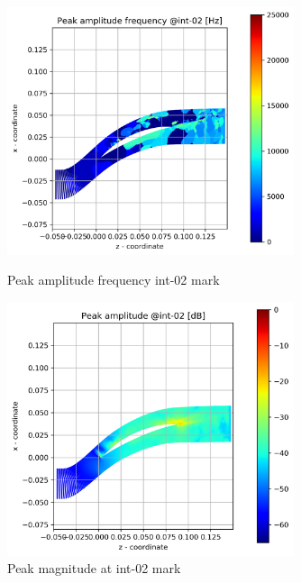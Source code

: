 \begin{figure}[ht]
  \centering
  \includegraphics[width=0.75\textwidth]{Figures/int-02-peak-freq.png}
  \caption{Peak amplitude frequency int-02 mark} \label{int-02-peak-freq}
  
  \vspace*{\floatsep}%

  \includegraphics[width=0.75\textwidth]{Figures/int-02-peak-mag.png}
  \caption{Peak magnitude at int-02 mark} \label{int-02-peak-mag}
\end{figure}

